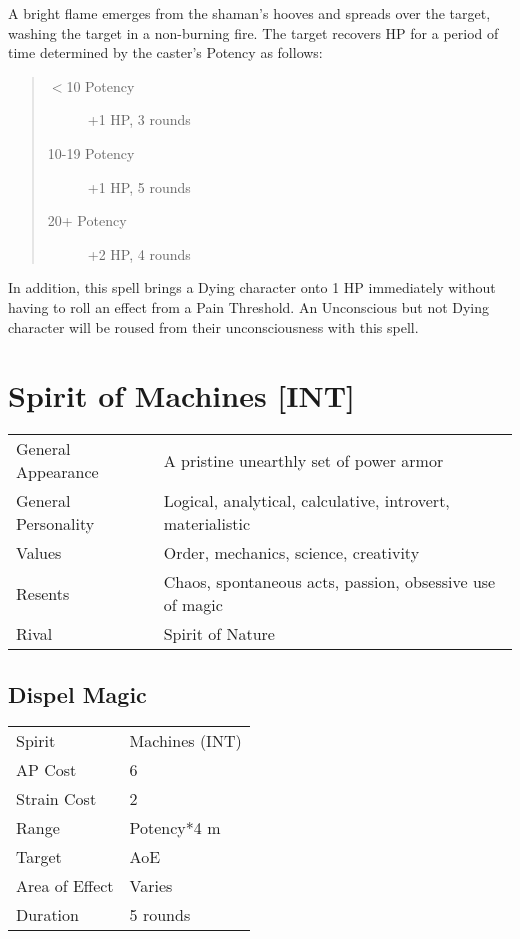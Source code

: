 \documentclass[11pt,a4paper,twocolumn]{book}
\begin{document}
\medskip

A bright flame emerges from the shaman's hooves and spreads over the target, washing the target in a non-burning fire. The target recovers HP for a period of time determined by the caster's Potency as follows:

\begin{quote}
	\begin{description}
		\item[$<$10 Potency] 	+1 HP, 3 rounds
		\item[10-19 Potency] 	+1 HP, 5 rounds
		\item[20+ Potency] 		+2 HP, 4 rounds
	\end{description}	
\end{quote}

In addition, this spell brings a Dying character onto 1 HP immediately without having to roll an effect from a Pain Threshold. An Unconscious but not Dying character will be roused from their unconsciousness with this spell.

\section*{Spirit of Machines [INT]}
{
	\begin{tabu} to 75mm{| X[l,4] | X[l,8] |}
		\hline
		General Appearance  & A pristine unearthly set of power armor                    \\
		General Personality & Logical, analytical, calculative, introvert, materialistic \\
		Values              & Order, mechanics, science, creativity                      \\
		Resents             & Chaos, spontaneous acts, passion, obsessive use of magic   \\
		Rival               & Spirit of Nature                                           \\ \hline
	\end{tabu}
	
}

\medskip

\subsection*{Dispel Magic}
{
	\begin{tabu} to 75mm{| X[l,4] | X[l,7] |}
		\hline
		Spirit         & Machines (INT) \\
		AP Cost        & 6              \\
		Strain Cost    & 2              \\
		Range          & Potency*4 m    \\
		Target         & AoE            \\
		Area of Effect & Varies         \\
		Duration       & 5 rounds       \\ \hline
	\end{tabu}
	
}
\end{document}
